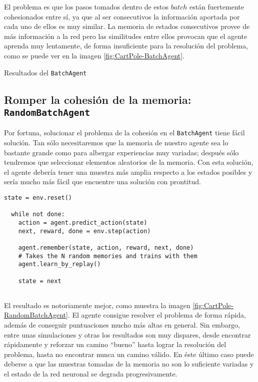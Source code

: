 El problema es que los pasos tomados dentro de estos $batch$ están fuertemente cohesionados entre sí, ya que al ser consecutivos la información aportada por cada uno de ellos es muy similar. La memoria de estados consecutivos provee de más información a la red pero las similitudes entre ellos provocan que el agente aprenda muy lentamente, de forma insuficiente para la resolución del problema, como se puede ver en la imagen \ref{fig:CartPole-BatchAgent}.

%
       {Resultados del \texttt{BatchAgent}}


\subsection{Romper la cohesión de la memoria: \texttt{RandomBatchAgent}}
\label{sec:cartpoledqn3}

Por fortuna, solucionar el problema de la cohesión en el \texttt{BatchAgent} tiene fácil solución. Tan sólo necesitaremos que la memoria de nuestro agente sea lo bastante grande como para albergar experiencias muy variadas; después sólo tendremos que seleccionar elementos aleatorios de la memoria. Con esta solución, el agente debería tener una muestra más amplia respecto a los estados posibles y sería mucho más fácil que encuentre una solución con prontitud.
  
\begin{minipage}{0.9\linewidth}%
\begin{lstlisting}[frame=tb, caption=Pseudocódigo RandomBatchAgent, inputencoding=latin1, label=code:cartpole_drl3]
  state = env.reset()

  while not done:
    action = agent.predict_action(state)
    next, reward, done = env.step(action)

    agent.remember(state, action, reward, next, done)
    # Takes the N random memories and trains with them
    agent.learn_by_replay()

    state = next
              
\end{lstlisting}%
\end{minipage}

El resultado es notoriamente mejor, como muestra la imagen \ref{fig:CartPole-RandomBatchAgent}. El agente consigue resolver el problema de forma rápida, además de conseguir puntuaciones mucho más altas en general. Sin embargo, entre unas simulaciones y otras los resultados son muy dispares, desde encontrar rápidamente y reforzar un camino ``bueno'' hasta lograr la resolución del problema, hasta no encontrar nunca un camino válido. En éste último caso puede deberse a que las muestras tomadas de la memoria no son lo suficiente variadas y el estado de la red neuronal se degrada progresivamente.

